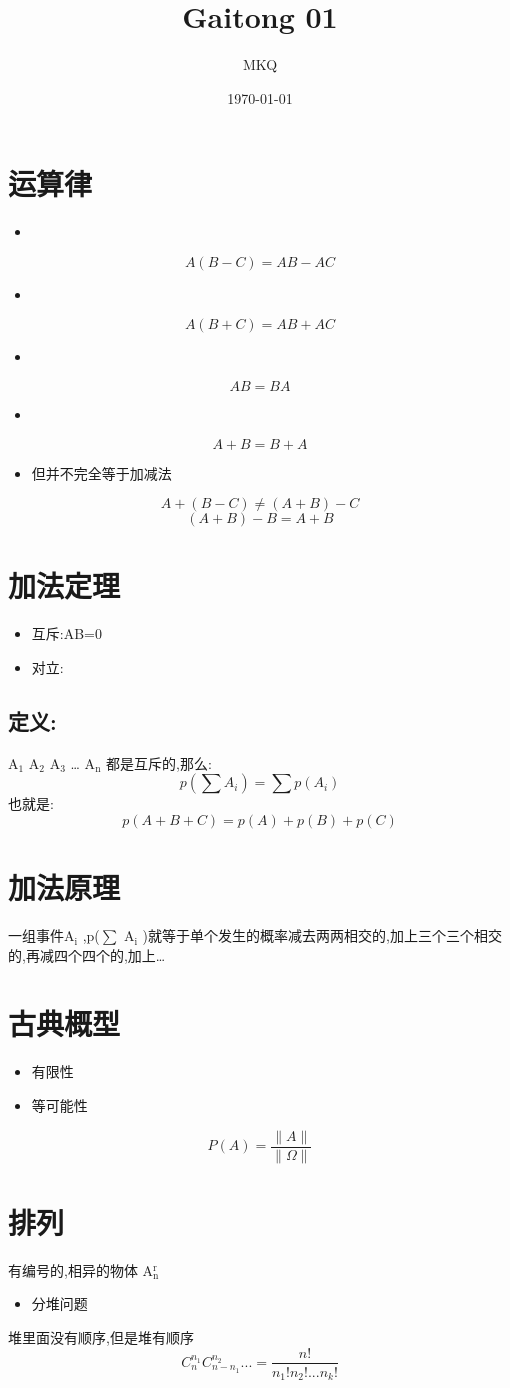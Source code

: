 \documentclass[11pt]{article}
\author{MKQ}
\date{\today}
\title{Gaitong 01}
\begin{document}
\maketitle
\tableofcontents

\section{运算律}
\label{sec:org987eff4}
\begin{itemize}
\item 
\end{itemize}
\[
A(B-C)=AB-AC
\]
\begin{itemize}
\item 
\end{itemize}
\[
A(B+C)=AB+AC
\]
\begin{itemize}
\item 
\end{itemize}
\[
AB=BA
\]
\begin{itemize}
\item 
\end{itemize}
\[
A+B=B+A
\]
\begin{itemize}
\item 但并不完全等于加减法
\end{itemize}
\[
A+(B-C) \neq (A+B)-C
\]
\[
(A+B)-B=A+B
\]
\section{加法定理}
\label{sec:org21cdf45}
\begin{itemize}
\item 互斥:AB=0
\item 对立:
\end{itemize}
\subsection{定义:}
\label{sec:org7b2de70}
A\(_{\text{1}}\) A\(_{\text{2}}\) A\(_{\text{3}}\) \ldots{} A\(_{\text{n}}\) 都是互斥的,那么:
 \[
 p (\sum A_i )=\sum p(A_i )
 \]
也就是:
\[
p(A + B + C)=p(A) + p(B) + p(C)
\]
\section{加法原理}
\label{sec:orgcc95025}
一组事件A\(_{\text{i}}\) ,p(\(\sum\) A\(_{\text{i}}\) )就等于单个发生的概率减去两两相交的,加上三个三个相交的,再减四个四个的,加上\ldots{}
\section{古典概型}
\label{sec:orgb00acc2}
\begin{itemize}
\item 有限性
\item 等可能性
\end{itemize}
\[
P(A)=\frac{\|A\|}{\|\Omega\|}
\]
\section{排列}
\label{sec:org0128cc1}
有编号的,相异的物体 A\(^{\text{r}}_{\text{n}}\) 
\begin{itemize}
\item 分堆问题
\end{itemize}
堆里面没有顺序,但是堆有顺序
\[
C_n^{n_1} C_{n-n_1 }^{n_2} ... = \frac{n!}{n_1 ! n_2 ! ... n_k !}
\]
\end{document}
